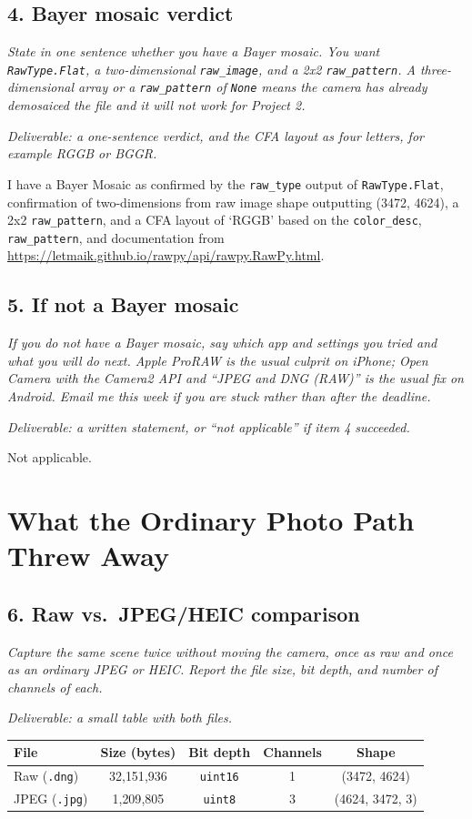 \documentclass[11pt]{article}
\newcommand{\task}[3]{\subsection*{#1}{\sloppy\noindent\textit{#2}\par}\smallskip\noindent\textit{Deliverable: #3}\par\medskip}
\begin{document}
\task{4. Bayer mosaic verdict}
{State in one sentence whether you have a Bayer mosaic. You want \texttt{RawType.Flat}, a two-dimensional \texttt{raw\_image}, and a 2x2 \texttt{raw\_pattern}. A three-dimensional array or a \texttt{raw\_pattern} of \texttt{None} means the camera has already demosaiced the file and it will not work for Project 2.}
{a one-sentence verdict, and the CFA layout as four letters, for example RGGB or BGGR.}

I have a Bayer Mosaic as confirmed by the \texttt{raw\_type} output of \texttt{RawType.Flat}, confirmation of two-dimensions from raw image shape outputting (3472, 4624), a 2x2 \texttt{raw\_pattern}, and a CFA layout of `RGGB' based on the \texttt{color\_desc}, \texttt{raw\_pattern}, and documentation from \url{https://letmaik.github.io/rawpy/api/rawpy.RawPy.html}.

\task{5. If not a Bayer mosaic}
{If you do not have a Bayer mosaic, say which app and settings you tried and what you will do next. Apple ProRAW is the usual culprit on iPhone; Open Camera with the Camera2 API and ``JPEG and DNG (RAW)'' is the usual fix on Android. Email me this week if you are stuck rather than after the deadline.}
{a written statement, or ``not applicable'' if item 4 succeeded.}

Not applicable.

\section*{What the Ordinary Photo Path Threw Away}

\task{6. Raw vs.\ JPEG/HEIC comparison}
{Capture the same scene twice without moving the camera, once as raw and once as an ordinary JPEG or HEIC. Report the file size, bit depth, and number of channels of each.}
{a small table with both files.}

\begin{center}
\begin{tabular}{lcccc}
\toprule
File & Size (bytes) & Bit depth & Channels & Shape \\
\midrule
Raw (\texttt{.dng}) & 32{,}151{,}936 & \texttt{uint16} & 1 & (3472, 4624) \\
JPEG (\texttt{.jpg}) & 1{,}209{,}805 & \texttt{uint8} & 3 & (4624, 3472, 3) \\
\bottomrule
\end{tabular}
\end{center}
\end{document}
